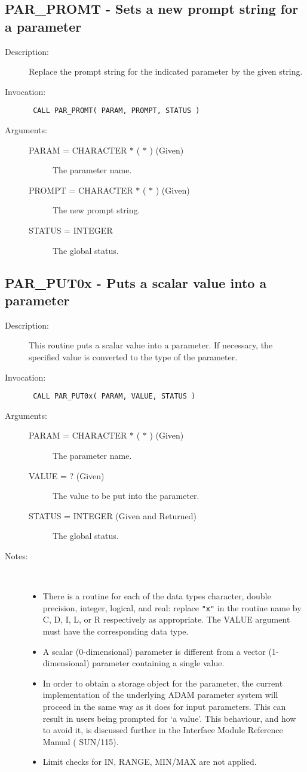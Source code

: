 \documentclass[twoside,11pt]{article}
\newcommand{\xref}[3]{#1}
\newcommand{\xlabel}[1]{}
\newlength{\sstbannerlength}
\newlength{\sstcaptionlength}
\newlength{\sstexampleslength}
\newlength{\sstexampleswidth}
\newcommand{\sstroutine}[3]{
   \goodbreak
   \rule{\textwidth}{0.5mm}
   \vspace{-7ex}
   \newline
   \settowidth{\sstbannerlength}{{\Large {\bf #1}}}
   \setlength{\sstcaptionlength}{\textwidth}
   \setlength{\sstexampleslength}{\textwidth}
   \addtolength{\sstbannerlength}{0.5em}
   \addtolength{\sstcaptionlength}{-2.0\sstbannerlength}
   \addtolength{\sstcaptionlength}{-5.0pt}
   \settowidth{\sstexampleswidth}{{\bf Examples:}}
   \addtolength{\sstexampleslength}{-\sstexampleswidth}
   \parbox[t]{\sstbannerlength}{\flushleft{\Large {\bf #1}}}
   \parbox[t]{\sstcaptionlength}{\center{\Large #2}}
   \parbox[t]{\sstbannerlength}{\flushright{\Large {\bf #1}}}
   \begin{description}
      #3
   \end{description}
}
\newcommand{\sstdescription}[1]{\item[Description:] #1}
\newcommand{\sstinvocation}[1]{\item[Invocation:]\hspace{0.4em}{\tt #1}}
\newcommand{\sstarguments}[1]{
   \item[Arguments:] \mbox{} \\
   \vspace{-3.5ex}
   \begin{description}
      #1
   \end{description}
}
\newcommand{\sstsubsection}[1]{ \item[{#1}] \mbox{} \\}
\newcommand{\sstnotes}[1]{\item[Notes:] \mbox{} \\[1.3ex] #1}
\newcommand{\sstitemlist}[1]{
  \mbox{} \\
  \vspace{-7ex}
  \begin{itemize}
     #1
  \end{itemize}
}
\newcommand{\sstitem}{\item}
\newcommand{\ssttt}{\tt}
\renewcommand{\sstroutine}[3]{
      \subsection{\xlabel{12}#1\xlabel{#1}-\label{#1}#2}
      \begin{description}
         #3
      \end{description}
   }
\renewcommand{\sstdescription}[1]{\item[Description:]
      \begin{description}
         #1
      \end{description}
   }
\renewcommand{\sstinvocation}[1]{\item[Invocation:]
      \begin{description}
         {\ssttt #1}
      \end{description}
   }
\renewcommand{\sstarguments}[1]{
      \item[Arguments:]
      \begin{description}
         #1
      \end{description}
   }
\renewcommand{\sstsubsection}[1]{\item[{#1}]}
\renewcommand{\sstnotes}[1]{\item[Notes:]
      \begin{description}
         #1
      \end{description}
   }
\newcommand{\sstitemlist}[1]{
      \begin{itemize}
         #1
      \end{itemize}
   }
\begin{document}
\sstroutine{
   PAR\_PROMT
}{
   Sets a new prompt string for a parameter
}{
   \sstdescription{
      Replace the prompt string for the indicated parameter by the
      given string.
   }
   \sstinvocation{
      CALL PAR\_PROMT( PARAM, PROMPT, STATUS )
   }
   \sstarguments{
      \sstsubsection{
         PARAM = CHARACTER $*$ ( $*$ ) (Given)
      }{
         The parameter name.
      }
      \sstsubsection{
         PROMPT = CHARACTER $*$ ( $*$ ) (Given)
      }{
         The new prompt string.
      }
      \sstsubsection{
         STATUS = INTEGER
      }{
         The global status.
      }
   }
}

\sstroutine{
   PAR\_PUT0x
}{
   Puts a scalar value into a parameter
}{
   \sstdescription{
      This routine puts a scalar value into a parameter.  If necessary,
      the specified value is converted to the type of the parameter.
   }
   \sstinvocation{
      CALL PAR\_PUT0x( PARAM, VALUE, STATUS )
   }
   \sstarguments{
      \sstsubsection{
         PARAM = CHARACTER $*$ ( $*$ ) (Given)
      }{
         The parameter name.
      }
      \sstsubsection{
         VALUE = ? (Given)
      }{
         The value to be put into the parameter.
      }
      \sstsubsection{
         STATUS = INTEGER (Given and Returned)
      }{
         The global status.
      }
   }
   \sstnotes{
      \sstitemlist{

         \sstitem
         There is a routine for each of the data types character,
         double precision, integer, logical, and real: replace {\tt "x"} in the
         routine name by C, D, I, L, or R respectively as appropriate.  The
         VALUE argument must have the corresponding data type.

         \sstitem
         A scalar (0-dimensional) parameter is different from a vector
         (1-dimensional) parameter containing a single value.

         \sstitem
         In order to obtain a storage object for the parameter, the
         current implementation of the underlying ADAM parameter system
         will proceed in the same way as it does for input parameters.
         This can result in users being prompted for `a value'. This
         behaviour, and how to avoid it, is discussed further in the
         Interface Module Reference Manual (
         \xref{SUN/115}{sun115}{}).

         \sstitem
         Limit checks for IN, RANGE, MIN/MAX are not applied.
      }
   }
}
\end{document}

